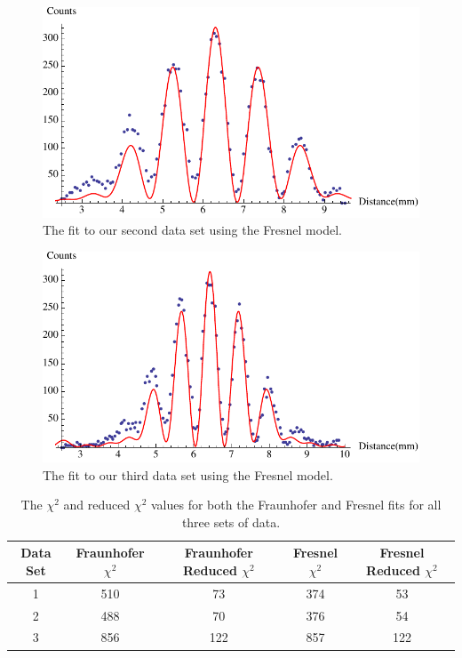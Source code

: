 \documentclass[prb,preprint]{revtex4-1}
\begin{document}
\begin{figure}[h!]
\centering
\includegraphics[width=6in]{doublefresnel2.pdf}
\caption{The fit to our second data set using the Fresnel model.}
\label{doublefresnel2}
\end{figure}

\begin{figure}[h!]
\centering
\includegraphics[width=6in]{doublefresnel3.pdf}
\caption{The fit to our third data set using the Fresnel model.}
\label{doublefresnel3}
\end{figure}


\begin{table}[h!]
\centering
\caption{The $\chi^2$ and reduced $\chi^2$ values for both the Fraunhofer and Fresnel fits for all three sets of data.}
\begin{ruledtabular}
\begin{tabular}{c c c c c}
Data Set & Fraunhofer $\chi^2$ & Fraunhofer Reduced $\chi^2$ & Fresnel $\chi^2$ & Fresnel Reduced $\chi^2$ \\
\hline	
1 & 510 &   73 & 374 &  53  \\
2 & 488 &   70 & 376 &  54  \\
3 & 856 & 122 & 857 & 122 \\

\end{tabular}
\end{ruledtabular}
\label{chisquared}
\end{table}
\end{document}
